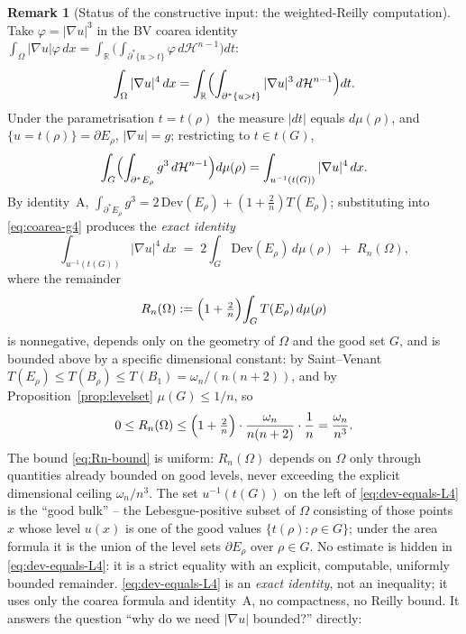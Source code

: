 \documentclass[11pt]{amsart}
\theoremstyle{definition}
\newtheorem{remark}[theorem]{Remark}
\newcommand{\R}{\mathbb R}
\newcommand{\Om}{\Omega}
\newcommand{\Hn}{\mathcal H^{n-1}}
\begin{document}
\begin{remark}[Status of the constructive input: the weighted-Reilly computation]
Take \(\varphi=|\nabla u|^3\) in the BV coarea identity
\(\int_\Om|\nabla u|\varphi\,dx=\int_\R\bigl(\int_{\partial^*\{u>t\}}\varphi\,d\Hn\bigr)dt\):
\[
   \int_\Om|\nabla u|^4\,dx
   =\int_\R\Bigl(\int_{\partial^*\{u>t\}}|\nabla u|^3\,d\Hn\Bigr)dt .
\]
Under the parametrisation \(t=t(\rho)\) the measure \(|dt|\) equals
\(d\mu(\rho)\), and \(\{u=t(\rho)\}=\partial E_\rho\), \(|\nabla u|=g\); restricting
to \(t\in t(G)\),
\begin{equation}\label{eq:coarea-g4}
   \int_G\Bigl(\int_{\partial^*E_\rho}g^3\,d\Hn\Bigr)d\mu(\rho)
   =\int_{u^{-1}(t(G))}|\nabla u|^4\,dx .
\end{equation}
By identity~A, \(\int_{\partial^*E_\rho}g^3=2\,\mathrm{Dev}(E_\rho)
+(1+\tfrac2n)T(E_\rho)\); substituting into \eqref{eq:coarea-g4} produces the
\emph{exact identity}
\begin{equation}\label{eq:dev-equals-L4}
   \int_{u^{-1}(t(G))}|\nabla u|^4\,dx
   \;=\;
   2\!\int_G\!\mathrm{Dev}(E_\rho)\,d\mu(\rho)
   \;+\;R_n(\Om),
\end{equation}
where the remainder
\[
   R_n(\Om):=\Bigl(1+\tfrac2n\Bigr)\!\int_G T(E_\rho)\,d\mu(\rho)
\]
is nonnegative, depends only on the geometry of \(\Om\) and the good set \(G\),
and is bounded above by a specific dimensional constant: by Saint--Venant
\(T(E_\rho)\le T(B_\rho)\le T(B_1)=\omega_n/(n(n+2))\), and by
Proposition~\ref{prop:levelset} \(\mu(G)\le1/n\), so
\begin{equation}\label{eq:Rn-bound}
   0\le R_n(\Om)\le \Bigl(1+\tfrac2n\Bigr)\cdot
   \frac{\omega_n}{n(n+2)}\cdot\frac1n
   =\frac{\omega_n}{n^3} .
\end{equation}
The bound \eqref{eq:Rn-bound} is uniform: \(R_n(\Om)\) depends on \(\Om\) only
through quantities already bounded on good levels, never exceeding the explicit
dimensional ceiling \(\omega_n/n^3\).  The set \(u^{-1}(t(G))\) on the left of
\eqref{eq:dev-equals-L4} is the ``good bulk'' -- the Lebesgue-positive subset of
\(\Om\) consisting of those points \(x\) whose level \(u(x)\) is one of the good
values \(\{t(\rho):\rho\in G\}\); under the area formula it is the union of the
level sets \(\partial E_\rho\) over \(\rho\in G\).  No estimate is hidden in
\eqref{eq:dev-equals-L4}: it is a strict equality with an explicit, computable,
uniformly bounded remainder.
\eqref{eq:dev-equals-L4} is an \emph{exact identity}, not an inequality; it uses
only the coarea formula and identity~A, no compactness, no Reilly bound.  It
answers the question ``why do we need \(|\nabla u|\) bounded?'' directly:
\begin{itemize}[leftmargin=2em]

\end{itemize}
\end{remark}
\end{document}

